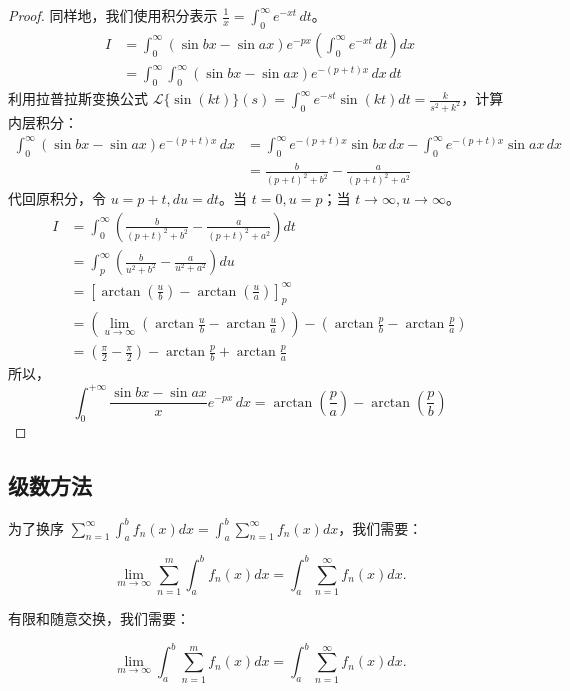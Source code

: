 \documentclass[lang=cn,10pt,thmcnt=section]{elegantbook}
\begin{document}
\begin{proof}
	同样地，我们使用积分表示 $\frac{1}{x} = \int_{0}^{\infty} e^{-xt} \, dt$。
\begin{align*}
I &= \int_{0}^{\infty} (\sin bx - \sin ax)e^{-px} \left( \int_{0}^{\infty} e^{-xt} \, dt \right) dx \\
&= \int_{0}^{\infty} \int_{0}^{\infty} (\sin bx - \sin ax)e^{-(p+t)x} \, dx \, dt
\end{align*}
利用拉普拉斯变换公式 $\mathcal{L}\{\sin(kt)\}(s) = \int_0^\infty e^{-st}\sin(kt)dt = \frac{k}{s^2+k^2}$，计算内层积分：
\begin{align*}
\int_{0}^{\infty} (\sin bx - \sin ax)e^{-(p+t)x} \, dx &= \int_{0}^{\infty} e^{-(p+t)x}\sin bx \, dx - \int_{0}^{\infty} e^{-(p+t)x}\sin ax \, dx \\
&= \frac{b}{(p+t)^2+b^2} - \frac{a}{(p+t)^2+a^2}
\end{align*}
代回原积分，令 $u=p+t, du=dt$。当 $t=0, u=p$；当 $t\to\infty, u\to\infty$。
\begin{align*}
I &= \int_{0}^{\infty} \left( \frac{b}{(p+t)^2+b^2} - \frac{a}{(p+t)^2+a^2} \right) dt \\
&= \int_{p}^{\infty} \left( \frac{b}{u^2+b^2} - \frac{a}{u^2+a^2} \right) du \\
&= \left[ \arctan\left(\frac{u}{b}\right) - \arctan\left(\frac{u}{a}\right) \right]_{p}^{\infty} \\
&= \left( \lim_{u\to\infty} \left(\arctan\frac{u}{b} - \arctan\frac{u}{a}\right) \right) - \left( \arctan\frac{p}{b} - \arctan\frac{p}{a} \right) \\
&= \left( \frac{\pi}{2} - \frac{\pi}{2} \right) - \arctan\frac{p}{b} + \arctan\frac{p}{a}
\end{align*}
所以，
\[ \int_{0}^{+\infty}\frac{\sin bx-\sin ax}{x}e^{-px} \,dx = \arctan\left(\frac{p}{a}\right) - \arctan\left(\frac{p}{b}\right) \]

\end{proof}
\subsection{级数方法}
为了换序 \(\sum_{n=1}^{\infty} \int_{a}^{b} f_n(x) dx = \int_{a}^{b} \sum_{n=1}^{\infty} f_n(x) dx\)，我们需要：

\[\lim_{m \to \infty} \sum_{n=1}^{m} \int_{a}^{b} f_n(x) dx = \int_{a}^{b} \sum_{n=1}^{\infty} f_n(x) dx.\]

有限和随意交换，我们需要：

\[\lim_{m \to \infty} \int_{a}^{b} \sum_{n=1}^{m} f_n(x) dx = \int_{a}^{b} \sum_{n=1}^{\infty} f_n(x) dx.\]
\end{document}
